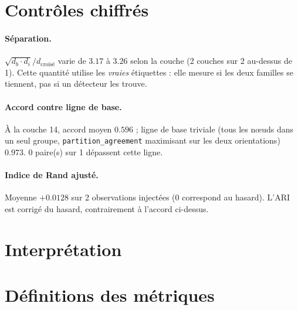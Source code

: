 \documentclass[11pt,a4paper]{article}
\begin{document}
\section{Contrôles chiffrés}


\paragraph{Séparation.} $\sqrt{d_b \cdot d_i} / d_{\text{croisé}}$ varie
de $3.17$ à $3.26$ selon la couche
(2 couches sur 2 au-dessus de 1).
Cette quantité utilise les \emph{vraies} étiquettes : elle mesure si les deux
familles se tiennent, pas si un détecteur les trouve.



\paragraph{Accord contre ligne de base.} À la couche 14, accord moyen
$0.596$ ; ligne de base triviale (tous les n\oe uds dans
un seul groupe, \texttt{partition\_agreement} maximisant sur les deux
orientations) $0.973$.
0 paire(s) sur 1 dépassent cette ligne.



\paragraph{Indice de Rand ajusté.} Moyenne $+0.0128$ sur
2 observations injectées (0 correspond au hasard). L'ARI est corrigé
du hasard, contrairement à l'accord ci-dessus.


\section{Interprétation}



\section{Définitions des métriques}
\end{document}
